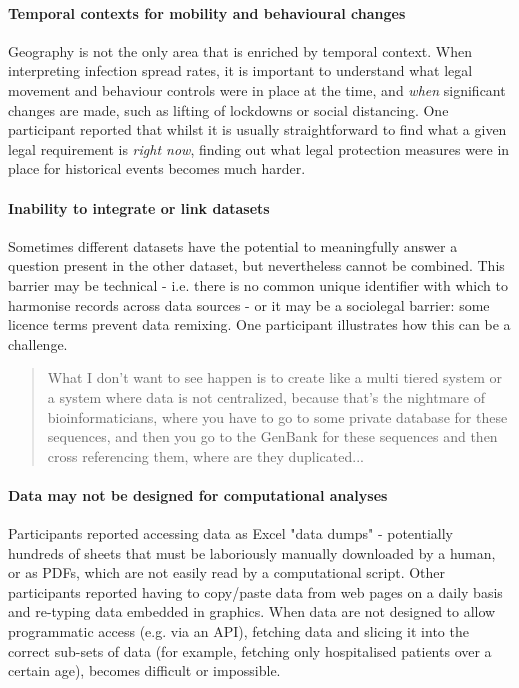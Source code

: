 \documentclass{CUP-JNL-DAP}%
\begin{document}
\paragraph{Temporal contexts for mobility and behavioural changes}
Geography is not the only area that is enriched by temporal context. When interpreting infection spread rates, it is important to understand what legal movement and behaviour controls were in place at the time, and \textit{when} significant changes are made, such as lifting of lockdowns or social distancing. One participant reported that whilst it is usually straightforward to find what a given legal requirement is \textit{right now}, finding out what legal protection measures were in place for historical events becomes much harder. 

\paragraph{Inability to integrate or link datasets}
Sometimes different datasets have the potential to meaningfully answer a question present in the other dataset, but nevertheless cannot be combined. This barrier may be technical - i.e. there is no common unique identifier with which to harmonise records across data sources - or it may be a sociolegal barrier: some licence terms prevent data remixing. One participant illustrates how this can be a challenge.

\blockquote{What I don't want to see happen is to create like a multi tiered system or a system where data is not centralized, because that's the nightmare of bioinformaticians, where you have to go to some private database for these sequences, and then you go to the GenBank for these sequences and then cross referencing them, where are they duplicated...}

\paragraph{Data may not be designed for computational analyses}

Participants reported accessing data as Excel "data dumps" - potentially hundreds of sheets that must be laboriously manually downloaded by a human, or as PDFs, which are not easily read by a computational script. Other participants reported having to copy/paste data from web pages on a daily basis and re-typing data embedded in graphics. When data are not designed to allow programmatic access (e.g. via an API), fetching data and slicing it into the correct sub-sets of data (for example, fetching only hospitalised patients over a certain age), becomes difficult or impossible. 
\end{document}
